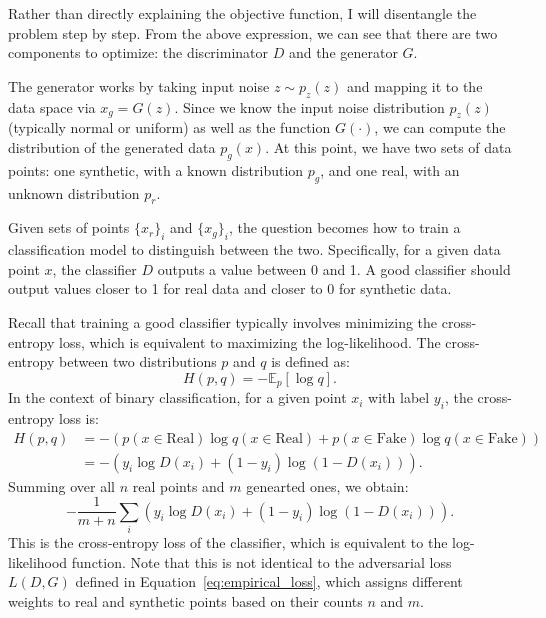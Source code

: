 \documentclass[12pt]{article}
\begin{document}
Rather than directly explaining the objective function, I will disentangle the
problem step by step. From the above expression, we can see that there are two
components to optimize: the discriminator \(D\) and the generator \(G\).

The generator works by taking input noise \(z \sim p_z(z)\) and mapping it to
the data space via \(x_g = G(z)\). Since we know the input noise distribution
\(p_z(z)\) (typically normal or uniform) as well as the function \(G(\cdot)\),
we can compute the distribution of the generated data \(p_g(x)\). At this
point, we have two sets of data points: one synthetic, with a known
distribution \(p_g\), and one real, with an unknown distribution \(p_r\).

Given sets of points \(\{x_r\}_i\) and \(\{x_g\}_i\), the question becomes how
to train a classification model to distinguish between the two. Specifically,
for a given data point \(x\), the classifier \(D\) outputs a value between 0
and 1. A good classifier should output values closer to 1 for real data and
closer to 0 for synthetic data.

Recall that training a good classifier typically involves minimizing the
cross-entropy loss, which is equivalent to maximizing the log-likelihood. The
cross-entropy between two distributions \(p\) and \(q\) is defined as:
\begin{equation*}
    H(p, q) = -\mathbb{E}_p[\log q].
\end{equation*}
In the context of binary classification, for a given point \(x_i\) with label \(y_i\), the cross-entropy loss is:
\begin{equation*}
    \begin{split}
        H(p, q) & = - \left( p(x \in \text{Real}) \log q(x \in \text{Real}) + p(x \in \text{Fake}) \log q(x \in \text{Fake}) \right) \\
        & = -\left(y_i \log D(x_i) + (1-y_i) \log (1-D(x_i))\right).
    \end{split}
\end{equation*}
Summing over all $n$ real points and $m$ genearted ones, we obtain:
\begin{equation*}
    -\frac{1}{m+n}\sum_i \left( y_i \log D(x_i) + (1-y_i) \log (1-D(x_i)) \right).
\end{equation*}
This is the cross-entropy loss of the classifier, which is equivalent to the log-likelihood function. Note that this is not identical to the adversarial loss \(L(D, G)\) defined in Equation~\eqref{eq:empirical_loss}, which assigns different weights to real and synthetic points based on their counts \(n\) and \(m\).
\end{document}
